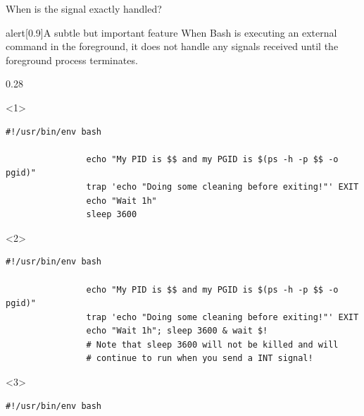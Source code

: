 \begin{frame}[fragile]{When is the signal exactly handled?}
    \vspace{-4mm}
    \begin{varblock}{alert}[0.9\textwidth]{A subtle but important feature}
        When Bash is executing an external command in the foreground, it does not handle any signals received until the foreground process terminates.
    \end{varblock}
    \vspace{2mm}
    \begin{overlayarea}{\textwidth}{0.28\textheight}
        \begin{onlyenv}<1>
            \begin{lstlisting}[style=MyBash]
                #!/usr/bin/env bash

                echo "My PID is $$ and my PGID is $(ps -h -p $$ -o pgid)"
                trap 'echo "Doing some cleaning before exiting!"' EXIT
                echo "Wait 1h"
                sleep 3600
            \end{lstlisting}
        \end{onlyenv}
        \begin{onlyenv}<2>
            \begin{lstlisting}[style=MyBash, firstnumber=6]
                #!/usr/bin/env bash

                echo "My PID is $$ and my PGID is $(ps -h -p $$ -o pgid)"
                trap 'echo "Doing some cleaning before exiting!"' EXIT
                echo "Wait 1h"; sleep 3600 & wait $!
                # Note that sleep 3600 will not be killed and will
                # continue to run when you send a INT signal!
            \end{lstlisting}
        \end{onlyenv}
        \begin{onlyenv}<3>
            \begin{lstlisting}[style=MyBash, firstnumber=12]
                #!/usr/bin/env bash


\end{lstlisting}
\end{onlyenv}
\end{overlayarea}
\end{frame}
